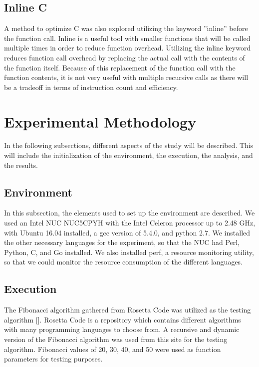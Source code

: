 \documentclass{sig-alternate}
\begin{document}
\subsection{Inline C}

A method to optimize C was also explored utilizing the keyword ''inline'' before the function call. Inline is a useful tool with smaller functions that will be called multiple times in order to reduce function overhead. Utilizing the inline keyword reduces function call overhead by replacing the actual call with the contents of the function itself. Because of this replacement of the function call with the function contents, it is not very useful with multiple recursive calls as there will be a tradeoff in terms of instruction count and efficiency.

\section{Experimental Methodology}

In the following subsections, different aspects of the study will be described. This will include the initialization of the environment, the execution, the analysis, and the results.

\subsection{Environment}

In this subsection, the elements used to set up the environment are described. We used an Intel NUC NUC5CPYH with the Intel Celeron processor up to 2.48 GHz, with Ubuntu 16.04 installed, a gcc version of 5.4.0, and python 2.7. We installed the other necessary languages for the experiment, so that the NUC had Perl, Python, C, and Go installed. We also installed perf, a resource monitoring utility, so that we could monitor the resource consumption of the different languages. 

\subsection{Execution}

The Fibonacci algorithm gathered from Rosetta Code was utilized as the testing algorithm [\cite{rosetta}]. Rosetta Code is a repository which contains different algorithms with many programming languages to choose from. A recursive and dynamic version of the Fibonacci algorithm was used from this site for the testing algorithm. Fibonacci values of 20, 30, 40, and 50 were used as function parameters for testing purposes.
\end{document}
